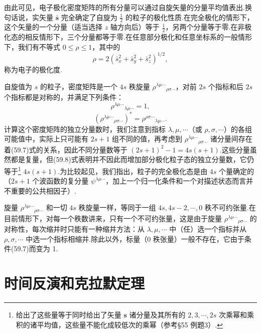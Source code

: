 由此可见，电子极化密度矩阵的所有分量可以通过自旋矢量的分量平均值表出.换句话说，实矢量 $\bar{\boldsymbol{s}}$ 完全确定了自旋为 $\frac{1}{2}$ 的粒子的极化性质.在完全极化的情形下，这个矢量的一个分量（适当选择 $z$ 轴方向后）等于 $\frac{1}{2}$，另两个分量等于零.在非极化态的相反情形下，三个分量都等于零.在任意部分极化和任意坐标系的一般情形下，我们有不等式 $0\leqslant\rho\leqslant1$，其中的
\begin{equation*}
  \rho=2\left(\bar{s}_x^2+\bar{s}_y^2+\bar{s}_z^2\right)^{1/2},
\end{equation*}
称为电子的极化度.

自旋值为 $s$ 的粒子，密度矩阵是一个 $4s$ 秩旋量 $\rho^{\lambda\mu\cdots}{}_{\rho\sigma\cdots}$，对前 $2s$ 个指标和后 $2s$ 个指标都是对称的，并满足下列条件：
\begin{equation}
  \rho^{\lambda\mu\cdots}{}_{\lambda\mu\cdots}=1,
\end{equation}
\begin{equation}
  \left(\rho^{\lambda\mu\cdots}{}_{\rho\sigma\cdots}\right)^*
  =\rho^{\rho\sigma\cdots}{}_{\lambda\mu\cdots}.
\end{equation}
计算这个密度矩阵的独立分量数时，我们注意到指标 $\lambda,\mu,\cdots$（或 $\rho,\sigma,\cdots$）的各组可能值中，实际上只可能有 $2s+1$ 组不同的值，再考虑到 $\rho^{\lambda\mu\cdots}{}_{\rho\sigma\cdots}$ 诸分量间存在着(59.7)式的关系，因此不同分量数等于 $(2s+1)^2-1=4s(s+1)$.这些分量虽然都是复量，但(59.8)式表明并不因此而增加部分极化粒子态的独立分量数，它仍等于\footnote{给出了这些量等于同时给出了矢量 $\boldsymbol{s}$ 诸分量及其所有的 $2,3,\cdots,2s$ 次乘幂和乘积的诸平均值，这些量不能化成较低次的乘幂（参考§55 例题3）.} $4s(s+1)$.为比较起见，我们指出，粒子的完全极化态是由 $4s$ 个量确定的（$2s+1$ 个波函数的复分量 $\psi^{\lambda\mu\cdots}$，加上一个归一化条件和一个对描述状态而言并不重要的公共相因子）.

旋量 $\rho^{\lambda\mu\cdots}{}_{\rho\sigma\cdots}$ 和一切 $4s$ 秩旋量一样，等同于一组 $4s,4s-2,\cdots,0$ 秩不可约张量.在目前情形下，对每一个秩数讲来，只有一个不可约张量，这是由于旋量 $\rho^{\lambda\mu\cdots}{}_{\rho\sigma\cdots}$ 的对称性，每次缩并时只能有一种缩并方法：从 $\lambda,\mu,\cdots$ 中（任）选一个指标并从 $\rho,\sigma,\cdots$ 中选一个指标相缩并.除此以外，标量（0 秩张量）一般不存在，它由于条件(59.7)而变为 1.

\section{时间反演和克拉默定理}

